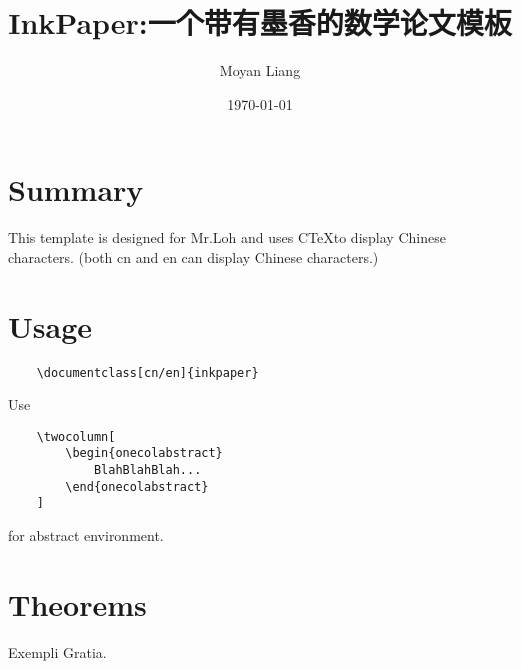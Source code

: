 \documentclass[en]{inkpaper}
\title{InkPaper:一个带有墨香的数学论文模板}
\author{Moyan Liang}
\date{\today}
\begin{document}
\maketitle
\section{Summary}
This template is designed for Mr.Loh and uses C\TeX to display Chinese characters.
(both cn and en can display Chinese characters.)
\section{Usage}
\begin{lstlisting}
    \documentclass[cn/en]{inkpaper}
\end{lstlisting}
Use
\begin{lstlisting}
    \twocolumn[
        \begin{onecolabstract}
            BlahBlahBlah...
        \end{onecolabstract}
    ]
\end{lstlisting}
for abstract environment.
\section{Theorems}
\begin{theorem}
    Exempli Gratia.
\end{theorem}
\end{document}

